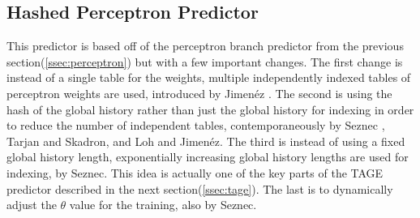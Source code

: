 \documentclass[conference]{IEEEtran}
\begin{document}
\subsection{Hashed Perceptron Predictor} \label{ssec:hp}
This predictor is based off of the perceptron branch predictor from the previous section(\ref{ssec:perceptron}) but with a few important changes. The first change is instead of a single table for the weights, multiple independently indexed tables of perceptron weights are used, introduced by Jimen\'ez \cite{jimenez2003}.  The second is using the hash of the global history rather than just the global history for indexing in order to reduce the number of independent tables, contemporaneously by Seznec \cite{seznec2004}, Tarjan and Skadron\cite{skadron2004}, and Loh and Jimen\'ez\cite{loh2005reducing}.  The third is instead of using a fixed global history length, exponentially increasing global history lengths are used for indexing, by Seznec\cite{seznec2004gehl}\cite{seznec2005analysis}. This idea is actually one of the key parts of the TAGE predictor described in the next section(\ref{ssec:tage}). The last is to dynamically adjust the $\theta$ value for the training, also by Seznec\cite{seznec2004gehl}\cite{seznec2005analysis}.
\end{document}
